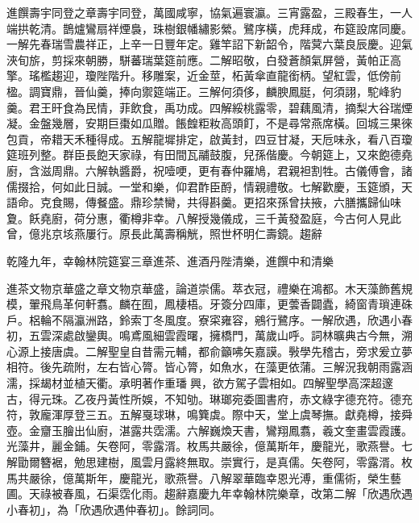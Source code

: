 \begin{pinyinscope}
進饌壽宇同登之章壽宇同登，萬國咸寧，協氣遍寰瀛。三宵露盈，三殿春生，一人端拱乾清。鵲爐鸞扇祥煙裊，珠樹銀幡繡影縈。鷺序橫，虎拜成，布筵設席同慶。一解先春瑞雪農祥正，上辛一日豐年定。雞竿詔下新韶令，階蓂六葉良辰慶。迎氣浹旬旂，剪採來朝勝，駢蕃瑞葉筵前應。二解昭敬，白發蒼顏氣屏營，黃帕正高擎。瑤檻趨迎，瓊陛階升。移雕案，近金莖，柘黃傘直龍銜柄。望紅雲，低傍前楹。調寶鼎，晉仙羹，捧向禦筵端正。三解何須侈，麟腴鳳脡，何須詡，駝峰豹羹。君王旰食為民情，菲飲食，禹功成。四解綏桃露零，碧藕風清，摘梨大谷瑞煙凝。金盤幾層，安期巨棗如瓜贈。餦餭粔籹高頭飣，不是尋常燕席橫。回城三果徠包貢，帝耤天禾種得成。五解龍墀排定，啟黃封，四豆甘凝，天卮味永，看八百瓊筵班列整。群臣長飽天家祿，有田間瓦鬴鼓腹，兒孫偕慶。今朝筵上，又來飽德堯廚，含滋周鼎。六解執醬爵，祝噎哽，更有春仲羅鳩，君親袒割牲。古儀傅會，諸儒掇拾，何如此日誠。一堂和樂，仰君酢臣酹，情親禮敬。七解歡慶，玉筵頒，天語命。克食賜，傳餐盛。鼎珍禁臠，共得斟羹。更招來孫曾扶掖，六膳攜歸仙味夐。飫堯廚，荷分惠，衢樽非幸。八解授幾儀成，三千黃發盈庭，今古何人見此曾，億兆京垓燕屢行。原長此萬壽稱觥，照世杯明仁壽鏡。趨辭

乾隆九年，幸翰林院筵宴三章進茶、進酒丹陛清樂，進饌中和清樂

進茶文物京華盛之章文物京華盛，論道崇儒。萃衣冠，禮樂在鴻都。木天藻飾舊規模，翬飛鳥革何軒翥。麟在囿，鳳棲梧。牙簽分四庫，更蕓香闢蠹，綺窗青瑣連硃戶。梠輪不隔瀛洲路，鈴索丁冬風度。寮寀雍容，鵷行鷺序。一解欣遇，欣遇小春初，五雲深處啟鑾輿。鳴鳶風細雲霞曙，擁橋門，萬歲山呼。詞林曠典古今無，溯心源上接唐虞。二解聖皇自昔需元輔，都俞籲咈矢嘉謨。斅學先稽古，旁求爰立夢相符。後先疏附，左右皆心膂。皆心膂，如魚水，在藻更依蒲。三解況我朝雨露涵濡，採朅材並植天衢。承明著作重璠興，欲方駕子雲相如。四解聖學高深超邃古，得元珠。乙夜丹黃性所娛，不知劬。琳瑯宛委圖書府，赤文綠字德充符。德充符，敦龐渾厚登三五。五解戛球琳，鳴簨虡。際中天，堂上虞琴撫。獻堯樽，接舜壺。金齏玉膾出仙廚，湛露共霑濡。六解巍煥天書，鸞翔鳳翥，羲文奎畫雲霞護。光藻井，麗金鋪。矢卷阿，零露湑。枚馬共嚴徐，億萬斯年，慶龍光，歌燕譽。七解勖爾簪裾，勉思建樹，風雲月露終無取。崇實行，是真儒。矢卷阿，零露湑。枚馬共嚴徐，億萬斯年，慶龍光，歌燕譽。八解翠華臨幸恩光溥，重儒術，榮生藝圃。天祿被春風，石渠霑化雨。趨辭嘉慶九年幸翰林院樂章，改第二解「欣遇欣遇小春初」，為「欣遇欣遇仲春初」。餘詞同。


\end{pinyinscope}
